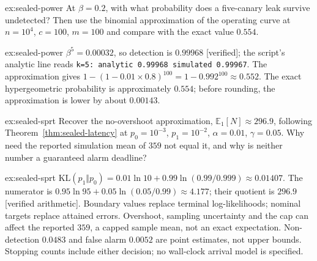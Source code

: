 \documentclass[11pt,a4paper]{article}
\theoremstyle{definition}
\begin{document}
\begin{pdexercise}[kind=Check,rating=1]{ex:sealed-power}
At $\beta=0.2$, with what probability does a five-canary leak survive
undetected? Then use the binomial approximation of the operating curve at
$n=10^4$, $c=100$, $m=100$ and compare with the exact value $0.554$.
\end{pdexercise}
\begin{pdsolution}{ex:sealed-power}
$\beta^5=0.00032$, so detection is $0.99968$ [verified]; the script's analytic
line reads \texttt{k=5: analytic 0.99968 simulated 0.99967}. The approximation
gives $1-(1-0.01\times0.8)^{100}=1-0.992^{100}\approx0.552$.
The exact hypergeometric probability is approximately $0.554$; before rounding,
the approximation is lower by about $0.00143$.
\end{pdsolution}

\begin{pdexercise}[kind=Trace,rating=2]{ex:sealed-sprt}
Recover the no-overshoot approximation, $\mathbb{E}_1[N]\approx296.9$, following
Theorem~\ref{thm:sealed-latency} at $p_0=10^{-3}$, $p_1=10^{-2}$,
$\alpha=0.01$, $\gamma=0.05$. Why need the reported simulation mean of $359$
not equal it, and why is neither number a guaranteed alarm deadline?
\end{pdexercise}
\begin{pdsolution}{ex:sealed-sprt}
\relax
$\mathrm{KL}(p_1\Vert p_0)=0.01\ln10+0.99\ln(0.99/0.999)\approx0.01407$.
The numerator is $0.95\ln95+0.05\ln(0.05/0.99)\approx4.177$;
their quotient is $296.9$ [verified arithmetic]. Boundary values replace terminal
log-likelihoods; nominal targets replace attained errors. Overshoot, sampling
uncertainty and the cap can affect the reported $359$, a capped sample mean, not an
exact expectation. Non-detection
$0.0483$ and false alarm $0.0052$ are point estimates, not upper bounds.
Stopping counts include either decision; no wall-clock arrival model is specified.
\end{pdsolution}
\end{document}
